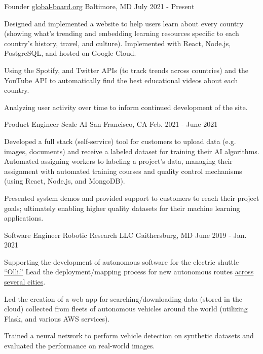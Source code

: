
\begin{cventries}
  \cventry
    {Founder} %
    {\href{https://global-board.org}{global-board.org}} %
    {Baltimore, MD} %
    {July 2021 - Present} %
    {
      \begin{cvitems} %
        \item {Designed and implemented a website to help users learn about every country (showing what's trending and embedding learning resources specific to each country's history, travel, and culture).  Implemented with React, Node.js, PostgreSQL, and hosted on Google Cloud.}
        \item {Using the Spotify, and Twitter APIs (to track trends across countries) and the YouTube API to automatically find the best educational videos about each country.}
        \item {Analyzing user activity over time to inform continued development of the site.}
      \end{cvitems}
    }

  \cventry
    {Product Engineer} %
    {Scale AI} %
    {San Francisco, CA} %
    {Feb. 2021 - June 2021} %
    {
      \begin{cvitems} %
        \item {Developed a full stack (self-service) tool for customers to upload data (e.g. images, documents) and receive a labeled dataset for training their AI algorithms.  Automated assigning workers to labeling a project's data, managing their assignment with automated training courses and quality control mechanisms (using React, Node.js, and MongoDB).}
        \item {Presented system demos and provided support to customers to reach their project goals; ultimately enabling higher quality datasets for their machine learning applications.}
      \end{cvitems}
    }

  \cventry
    {Software Engineer} %
    {Robotic Research LLC} %
    {Gaithersburg, MD} %
    {June 2019 - Jan. 2021} %
    {
      \begin{cvitems} %
        \item {Supporting the development of autonomous software for the electric 
          shuttle \href{https://localmotors.com/product/}{``Olli.''}  Lead the deployment/mapping process for new autonomous routes \href{https://localmotors.com/deployments}{across several cities}.}
        \item {Led the creation of a web app for searching/downloading data (stored in the cloud) collected from fleets of autonomous vehicles around the world (utilizing Flask, and various AWS services).}
        \item {Trained a neural network to perform vehicle detection on synthetic datasets and evaluated the performance on real-world images.}
      \end{cvitems}
    }


\end{cventries}
